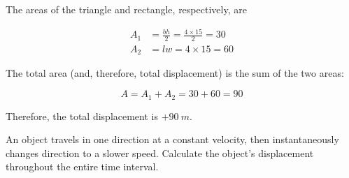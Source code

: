 \documentclass{article}
\numberwithin{equation}{section}
\numberwithin{figure}{section}
\begin{document}

The areas of the triangle and rectangle, respectively, are
\vspace{-1em}

\begin{align*}
    A_1 &= \frac{bh}{2} = \frac{4 \times 15}{2} = 30\\[1ex]
    A_2 &= lw = 4 \times 15 = 60
\end{align*}

The total area (and, therefore, total displacement) is the sum of the two areas:

\begin{equation*}
    A = A_1 + A_2 = 30 + 60 = 90
\end{equation*}

Therefore, the total displacement is $+\SI{90}{m}$.

\begin{example}
An object travels in one direction at a constant velocity, then instantaneously changes direction to a slower speed. Calculate the object's displacement throughout the entire time interval.
\end{example}

\begin{center}
\end{center}
\end{document}
